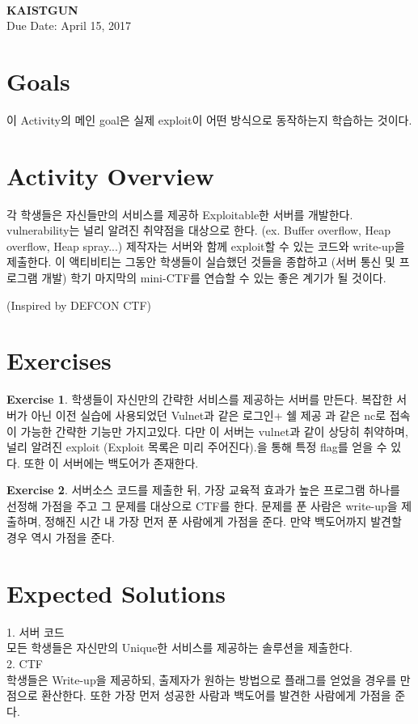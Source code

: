 \documentclass[a4paper, 11pt]{article}
\theoremstyle{definition}
\newtheorem{exercise}{Exercise}
\begin{document}
 \\
         {\phantom{} \hfill \textbf{KAISTGUN}} \\
         {\phantom{} \hfill Due Date: April 15, 2017} \\


\section{Goals}
이 Activity의 메인 goal은 실제 exploit이 어떤 방식으로 동작하는지 학습하는 것이다.

\section{Activity Overview}

각 학생들은 자신들만의 서비스를 제공하 Exploitable한 서버를 개발한다.  
vulnerability는 널리 알려진 취약점을 대상으로 한다. (ex. Buffer overflow, Heap overflow, Heap spray...)
제작자는 서버와 함께 exploit할 수 있는 코드와 write-up을 제출한다. 이 액티비티는 그동안 학생들이 실습했던 것들을 종합하고 (서버 통신 및 프로그램 개발) 학기 마지막의 mini-CTF를 연습할 수 있는 좋은 계기가 될 것이다.

(Inspired by DEFCON CTF)

\section{Exercises}

\begin{exercise}

  학생들이 자신만의 간략한 서비스를 제공하는 서버를 만든다. 복잡한 서버가 아닌 이전 실습에 사용되었던 Vulnet과 같은 로그인+ 쉘 제공 과 같은 nc로 접속이 가능한 간략한 기능만 가지고있다. 다만 이 서버는 vulnet과 같이 상당히 취약하며, 널리 알려진 exploit (Exploit 목록은 미리 주어진다).을 통해 특정 flag를 얻을 수 있다. 또한 이 서버에는 백도어가 존재한다.

\end{exercise}

\begin{exercise}

 서버소스 코드를 제출한 뒤, 가장 교육적 효과가 높은 프로그램 하나를 선정해 가점을 주고 그 문제를 대상으로 CTF를 한다. 문제를 푼 사람은 write-up을 제출하며, 정해진 시간 내 가장 먼저 푼 사람에게 가점을 준다. 만약 백도어까지 발견할 경우 역시 가점을 준다.

\end{exercise}

\section{Expected Solutions}


1. 서버 코드\\ 모든 학생들은 자신만의 Unique한 서비스를 제공하는 솔루션을 제출한다.\\
2. CTF\\학생들은 Write-up을 제공하되, 출제자가 원하는 방법으로 플래그를 얻었을 경우를 만점으로 환산한다. 또한 가장 먼저 성공한 사람과 백도어를 발견한 사람에게 가점을 준다.




\end{document}
